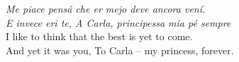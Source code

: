 

\copyrightpage

\commcertpage 

\titlepage              %


\begin{epigraph}
\hfill\begin{minipage}{0.6\textwidth}\raggedleft
{\it Me piace pens\'a che er mejo deve ancora ven\'i. }\\
{\it E invece eri te, A Carla, principessa mia p\'e sempre} \\[0.5cm]
\small{I like to think that the best is yet to come.}\\
\small{And yet it was you, To Carla -- my princess, forever.}
\end{minipage}
\end{epigraph}


\begin{acknowledgments}
\end{acknowledgments}

\utabstract


\tableofcontents   %

\listoftables      %
\listoffigures     %







